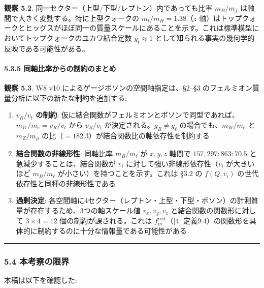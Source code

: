 \documentclass[
  a4paper,11pt]{ltjsarticle}
\providecommand{\tightlist}{%
  \setlength{\itemsep}{0pt}\setlength{\parskip}{0pt}}
\begin{document}
\textbf{観察 5.2}. 同一セクター（上型/下型/レプトン）内であっても比率
\(m_B / m_f\) は軸間で大きく変動する。特に上型クォークの
\(m_t / m_H = 1.38\)（\(z\)
軸）はトップクォークとヒッグスがほぼ同一の質量スケールにあることを示す。これは標準模型においてトップクォークのユカワ結合定数
\(y_t \approx 1\) として知られる事実の幾何学的反映である可能性がある。

\paragraph{5.3.5
同軸比率からの制約のまとめ}\label{ux540cux8ef8ux6bd4ux7387ux304bux3089ux306eux5236ux7d04ux306eux307eux3068ux3081}

\textbf{観察 5.3}. W8 v10 によるゲージボソンの空間軸指定は、§2--§3
のフェルミオン質量分析に以下の新たな制約を追加する:

\begin{enumerate}
\def\labelenumi{\arabic{enumi}.}
\tightlist
\item
  \textbf{\(v_R / v_t\) の制約}:
  仮に結合関数がフェルミオンとボソンで同型であれば、\(m_W / m_e = v_R / v_t\)
  から \(v_R / v_t\) が決定される。\(g_B \neq g_\ell\)
  の場合でも、\(m_W / m_e\) と \(m_Z / m_\mu\)
  の比（\(= 182.3\)）が結合関数比の軸依存性を制約する
\item
  \textbf{結合関数の非線形性}: 同軸比率 \(m_B / m_\ell\) が \(x, y, z\)
  軸間で \(157{,}297 : 863 : 70.5\) と急減少することは、結合関数が
  \(v_i\) に対して強い非線形依存性（\(v_i\) が大きいほど
  \(m_B / m_\ell\) が小さい）を持つことを示す。これは §3.2 の
  \(f(Q, v_i)\) の世代依存性と同種の非線形性である
\item
  \textbf{過剰決定}:
  各空間軸に4セクター（レプトン・上型・下型・ボソン）の計測質量が存在するため、3つの軸スケール値
  \(v_x, v_y, v_z\) と結合関数の関数形に対して \(3 \times 4 = 12\)
  個の制約が課される。これは \(f_m^{\text{rest}}\)（{[}4{]}
  定義9.4）の関数形を具体的に制約するのに十分な情報量である可能性がある
\end{enumerate}

\begin{center}\rule{0.5\linewidth}{0.5pt}\end{center}

\subsubsection{5.4
本考察の限界}\label{ux672cux8003ux5bdfux306eux9650ux754c}

本稿は以下を確認した:
\end{document}

